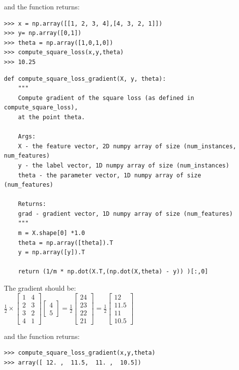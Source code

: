 \documentclass{article}
\newenvironment{sub}[2][$-$]{\begin{trivlist}
		\item[\hskip \labelsep {\bfseries #1}\hskip \labelsep {\bfseries #2.}]}  {\end{trivlist}}
\begin{document}
and the function returns:
\begin{verbatim}
>>> x = np.array([[1, 2, 3, 4],[4, 3, 2, 1]])
>>> y= np.array([0,1])
>>> theta = np.array([1,0,1,0])
>>> compute_square_loss(x,y,theta)
>>> 10.25
\end{verbatim}


\begin{sub}{2.2.7}
\end{sub}

\begin{verbatim}
def compute_square_loss_gradient(X, y, theta):
	"""
	Compute gradient of the square loss (as defined in compute_square_loss), 
	at the point theta.
	
	Args:
	X - the feature vector, 2D numpy array of size (num_instances, num_features)
	y - the label vector, 1D numpy array of size (num_instances)
	theta - the parameter vector, 1D numpy array of size (num_features)
	
	Returns:
	grad - gradient vector, 1D numpy array of size (num_features)
	"""
	m = X.shape[0] *1.0
	theta = np.array([theta]).T
	y = np.array([y]).T
	
	return (1/m * np.dot(X.T,(np.dot(X,theta) - y)) )[:,0]

\end{verbatim}

\begin{sub}{2.2.8}
\end{sub}

The gradient should be: \\
$\frac{1}{2} \times \begin{bmatrix}
 1&4\\ 2&3 \\ 3&2 \\4&1
\end{bmatrix}
\begin{bmatrix}
4\\5
\end{bmatrix} = \frac{1}{2}\begin{bmatrix}
24\\23\\22\\21
\end{bmatrix} = \frac{1}{2}\begin{bmatrix}
12\\11.5\\11\\10.5
\end{bmatrix}$ 

and the function returns:
\begin{verbatim}
>>> compute_square_loss_gradient(x,y,theta)
>>> array([ 12. ,  11.5,  11. ,  10.5])
\end{verbatim}
\end{document}
